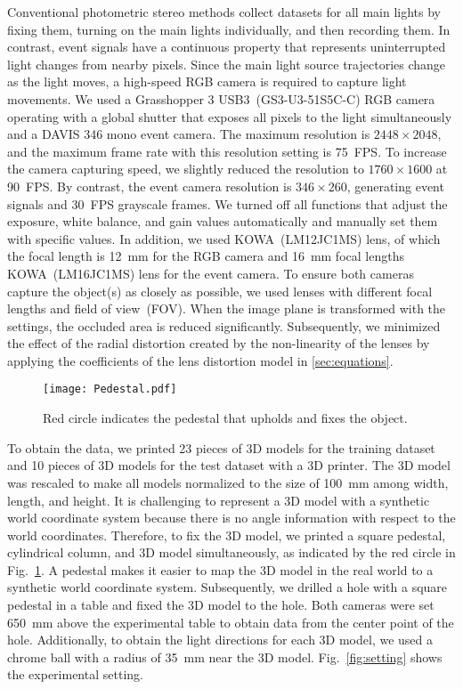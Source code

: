 \documentclass[preprint,12pt,authoryear]{elsarticle}
\begin{document}
Conventional photometric stereo methods collect datasets for all main lights by fixing them, turning on the main lights individually, and then recording them. In contrast, event signals have a continuous property that represents uninterrupted light changes from nearby pixels. Since the main light source trajectories change as the light moves, a high-speed RGB camera is required to capture light movements. We used a Grasshopper 3 USB3~(GS3-U3-51S5C-C) RGB camera operating with a global shutter that exposes all pixels to the light simultaneously and a DAVIS 346 mono event camera. The maximum resolution is $2448 \times 2048$, and the maximum frame rate with this resolution setting is 75~FPS. To increase the camera capturing speed, we slightly reduced the resolution to $1760 \times 1600$ at 90~FPS. By contrast, the event camera resolution is $346 \times 260$, generating event signals and 30~FPS grayscale frames. We turned off all functions that adjust the exposure, white balance, and gain values automatically and manually set them with specific values. In addition, we used KOWA~(LM12JC1MS) lens, of which the focal length is 12~mm for the RGB camera and 16~mm focal lengths KOWA~(LM16JC1MS) lens for the event camera. To ensure both cameras capture the object(s) as closely as possible, we used lenses with different focal lengths and field of view~(FOV). When the image plane is transformed with the settings, the occluded area is reduced significantly. Subsequently, we minimized the effect of the radial distortion created by the non-linearity of the lenses by applying the coefficients of the lens distortion model in \ref{sec:equations}.

\begin{figure}[t]
    \centering
    \texttt{[image: Pedestal.pdf]}
    \caption{Red circle indicates the pedestal that upholds and fixes the object.}
    \label{fig:Pedestal}
\end{figure}
To obtain the data, we printed 23 pieces of 3D models for the training dataset and 10 pieces of 3D models for the test dataset with a 3D printer. The 3D model was rescaled to make all models normalized to the size of 100~mm among width, length, and height. It is challenging to represent a 3D model with a synthetic world coordinate system because there is no angle information with respect to the world coordinates. Therefore, to fix the 3D model, we printed a square pedestal, cylindrical column, and 3D model simultaneously, as indicated by the red circle in Fig.~\ref{fig:Pedestal}. A pedestal makes it easier to map the 3D model in the real world to a synthetic world coordinate system. Subsequently, we drilled a hole with a square pedestal in a table and fixed the 3D model to the hole. Both cameras were set 650~mm above the experimental table to obtain data from the center point of the hole. Additionally, to obtain the light directions for each 3D model, we used a chrome ball with a radius of 35~mm near the 3D model. Fig.~\ref{fig:setting} shows the experimental setting.
\end{document}
